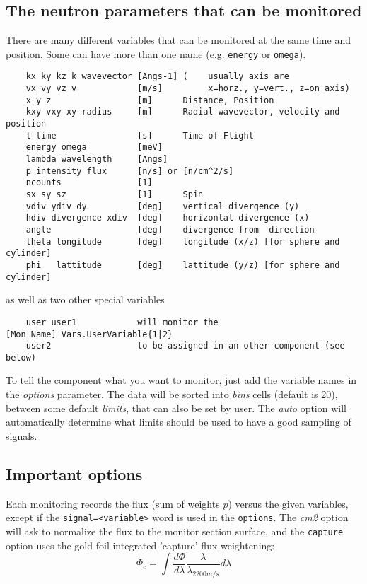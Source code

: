 \subsection{The neutron parameters that can be monitored}

There are many different variables that can be monitored at the same time
and position. Some can have more than one name (e.g. \texttt{energy} or
\texttt{omega}).


\begin{verbatim}
    kx ky kz k wavevector [Angs-1] (    usually axis are
    vx vy vz v            [m/s]         x=horz., y=vert., z=on axis)
    x y z                 [m]      Distance, Position
    kxy vxy xy radius     [m]      Radial wavevector, velocity and position
    t time                [s]      Time of Flight
    energy omega          [meV]
    lambda wavelength     [Angs]
    p intensity flux      [n/s] or [n/cm^2/s]
    ncounts               [1]
    sx sy sz              [1]      Spin
    vdiv ydiv dy          [deg]    vertical divergence (y)
    hdiv divergence xdiv  [deg]    horizontal divergence (x)
    angle                 [deg]    divergence from  direction
    theta longitude       [deg]    longitude (x/z) [for sphere and cylinder]
    phi   lattitude       [deg]    lattitude (y/z) [for sphere and cylinder]
\end{verbatim}
as well as two other special variables
\begin{verbatim}
    user user1            will monitor the [Mon_Name]_Vars.UserVariable{1|2}
    user2                 to be assigned in an other component (see below)
\end{verbatim}

To tell the component what you want to monitor, just add the variable
names in the {\it options} parameter. The data will be sorted into {\it
  bins} cells (default is 20), between some default {\it limits}, that
can also be set by user. The {\it auto} option will automatically
determine what limits should be used to have a good sampling of signals.

\subsection{Important options}

Each monitoring records the flux (sum of weights $p$) versus the
given variables, except if the \verb+signal=<variable>+ word is used in the \verb+options+.
The {\it cm2} option will ask to normalize the flux to the monitor section surface, and the \verb+capture+ option uses the gold foil integrated 'capture' flux weightening:
\begin{equation}
\Phi_c = \int{\frac{d\Phi}{d\lambda} \frac{\lambda}{\lambda_{2200 m/s}} d\lambda}
\end{equation}

